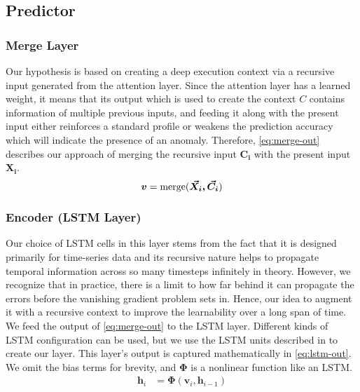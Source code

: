 \subsection{Predictor}
\label{subsec:predictor}
\subsubsection*{Merge Layer}
Our hypothesis is based on creating a deep execution context via a recursive 
input generated from the attention layer. Since the attention layer has a 
learned weight, it means that its output which is used to create the context $ 
C $ contains information of multiple previous inputs, and feeding it along with 
the present input either reinforces a standard profile or weakens the 
prediction accuracy which will indicate the presence of an anomaly. Therefore, 
\eqref{eq:merge-out} describes our approach of merging the recursive input $ 
\bm{C_i} $ with the present input $ \bm{X_i} $.
\begin{equation}
\bm{v} = \text{merge}(\bm{\vec{X_i},\vec{C_i}}) \\
\label{eq:merge-out}
\end{equation}

\subsubsection*{Encoder (LSTM Layer)}
\label{subsubsec:encoder}
Our choice of LSTM cells in this layer stems from the fact that it is designed 
primarily for time-series data and its recursive nature helps to propagate 
temporal information across so many timesteps infinitely in theory. However, we 
recognize that in practice, there is a limit to how far behind it can propagate 
the errors before the vanishing gradient problem sets in. Hence, our idea to 
augment it with a 
recursive context to improve the learnability over a long span of time. We 
feed the output of \eqref{eq:merge-out} to the LSTM layer. Different kinds of 
LSTM configuration can be used, but we use the LSTM units described in 
\cite{hochreiter1997long} to create our layer. This layer's output is captured 
mathematically in \eqref{eq:lstm-out}. We omit the bias terms for brevity, and 
$ \bm{\Phi} $ is a nonlinear function like an LSTM. 
\begin{align}
\bm{h}_{i} &= \bm{\Phi}\left(\bm{v}_i,\bm{h}_{i-1} \right)
\label{eq:lstm-out}
\end{align}

